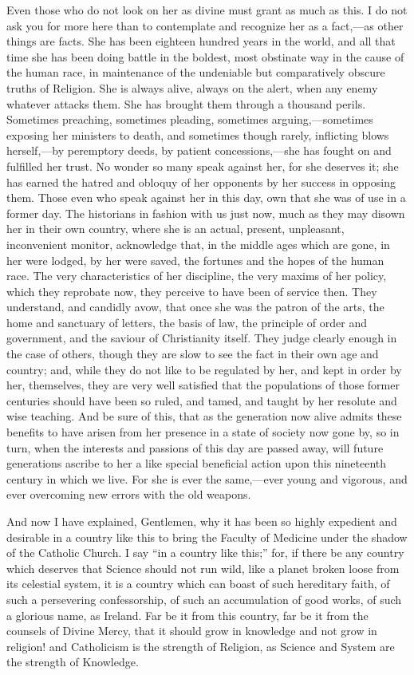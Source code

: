 Even those who do not look on her as divine must grant as much as
this. I do not ask you for more here than to contemplate and recognize
her as a fact,—as other things are facts. She has been eighteen
hundred years in the world, and all that time she has been doing
battle in the boldest, most obstinate way in the cause of the human
race, in maintenance of the undeniable but comparatively obscure
truths of Religion. She is always alive, always on the alert, when any
enemy whatever attacks them. She has brought them through a thousand
perils. Sometimes preaching, sometimes pleading, sometimes arguing,—sometimes
exposing her ministers to death, and sometimes though rarely,
inflicting blows herself,—by peremptory deeds, by patient
concessions,—she has fought on and fulfilled her trust. No wonder so
many speak against her, for she deserves it; she has earned the hatred
and obloquy of her opponents by her success in opposing them. Those
even who speak against her in this day, own that she was of use in a
former day. The historians in fashion with us just now, much as they
may disown her in their own country, where she is an actual, present,
unpleasant, inconvenient monitor, acknowledge that, in the middle ages
which are gone, in her were lodged, by her were saved, the fortunes
and the hopes of the human race. The very characteristics of her
discipline, the very maxims of her policy, which they reprobate now,
they perceive to have been of service then. They understand, and
candidly avow, that once she was the patron of the arts, the home and
sanctuary of letters, the basis of law, the principle of order and
government, and the saviour of Christianity itself. They judge clearly
enough in the case of others, though they are slow to see the fact in
their own age and country; and, while they do not like to be regulated
by her, and kept in order by her, themselves, they are very well
satisfied that the populations of those former centuries should have
been so ruled, and tamed, and taught by her resolute and wise
teaching. And be sure of this, that as the generation now alive admits
these benefits to have arisen from her presence in a state of society
now gone by, so in turn, when the interests and passions of this day
are passed away, will future generations ascribe to her a like special
beneficial action upon this nineteenth century in which we live. For
she is ever the same,—ever young and vigorous, and ever overcoming
new errors with the old weapons.

And now I have explained, Gentlemen, why it has been so highly
expedient and desirable in a country like this to bring the Faculty of
Medicine under the shadow of the Catholic Church. I say ``in a
country like this;'' for, if there be any country which deserves
that Science should not run wild, like a planet broken loose from its
celestial system, it is a country which can boast of such hereditary
faith, of such a persevering confessorship, of such an accumulation of
good works, of such a glorious name, as Ireland. Far be it from this
country, far be it from the counsels of Divine Mercy, that it should
grow in knowledge and not grow in religion! and Catholicism is the
strength of Religion, as Science and System are the strength of
Knowledge.

